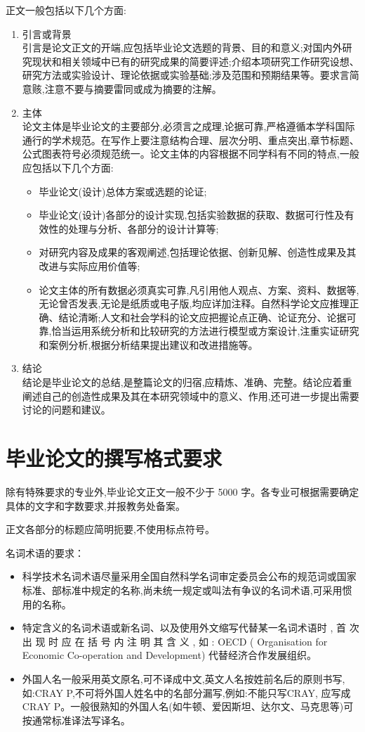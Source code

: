 ﻿\documentclass{sysuthesis}
\begin{document}
正文一般包括以下几个方面:

\begin{enumerate}
\item 引言或背景\\
引言是论文正文的开端,应包括毕业论文选题的背景、目的和意义;对国内外研究现状和相关领域中已有的研究成果的简要评述;介绍本项研究工作研究设想、研究方法或实验设计、理论依据或实验基础;涉及范围和预期结果等。要求言简意赅,注意不要与摘要雷同或成为摘要的注解。
\item 主体\\
论文主体是毕业论文的主要部分,必须言之成理,论据可靠,严格遵循本学科国际通行的学术规范。在写作上要注意结构合理、层次分明、重点突出,章节标题、公式图表符号必须规范统一。论文主体的内容根据不同学科有不同的特点,一般应包括以下几个方面:
\begin{itemize}
\item 毕业论文(设计)总体方案或选题的论证;
\item 毕业论文(设计)各部分的设计实现,包括实验数据的获取、数据可行性及有效性的处理与分析、各部分的设计计算等;
\item 对研究内容及成果的客观阐述,包括理论依据、创新见解、创造性成果及其改进与实际应用价值等;
\item 论文主体的所有数据必须真实可靠,凡引用他人观点、方案、资料、数据等,无论曾否发表,无论是纸质或电子版,均应详加注释。自然科学论文应推理正确、结论清晰;人文和社会学科的论文应把握论点正确、论证充分、论据可靠,恰当运用系统分析和比较研究的方法进行模型或方案设计,注重实证研究和案例分析,根据分析结果提出建议和改进措施等。
\end{itemize}
\item 结论\\
结论是毕业论文的总结,是整篇论文的归宿,应精炼、准确、完整。结论应着重阐述自己的创造性成果及其在本研究领域中的意义、作用,还可进一步提出需要讨论的问题和建议。
\end{enumerate}

\section{毕业论文的撰写格式要求}

除有特殊要求的专业外,毕业论文正文一般不少于 5000 字。各专业可根据需要确定具体的文字和字数要求,并报教务处备案。

正文各部分的标题应简明扼要,不使用标点符号。

名词术语的要求：

\begin{itemize}
\item 科学技术名词术语尽量采用全国自然科学名词审定委员会公布的规范词或国家标准、部标准中规定的名称,尚未统一规定或叫法有争议的名词术语,可采用惯用的名称。
\item 特定含义的名词术语或新名词、以及使用外文缩写代替某一名词术语时 , 首 次 出 现 时 应 在 括 号 内 注 明 其 含 义 , 如 : OECD ( Organisation for Economic Co-operation and Development) 代替经济合作发展组织。
\item 外国人名一般采用英文原名,可不译成中文,英文人名按姓前名后的原则书写,如:CRAY P,不可将外国人姓名中的名部分漏写,例如:不能只写CRAY, 应写成 CRAY P。一般很熟知的外国人名(如牛顿、爱因斯坦、达尔文、马克思等)可按通常标准译法写译名。
\end{itemize}
\end{document}
